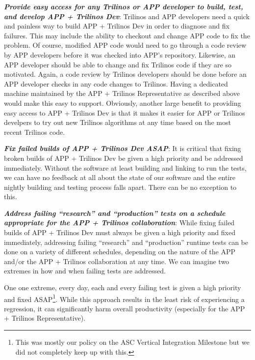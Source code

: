 \documentclass[pdf,ps2pdf,11pt]{SANDreport}
\begin{document}
{}\textit{\textbf{Provide easy access for any Trilinos or APP developer to
build, test, and develop APP + Trilinos Dev}}: Trilinos and APP developers
need a quick and painless way to build APP + Trilinos Dev in order to diagnose
and fix failures.  This may include the ability to checkout and change APP
code to fix the problem.  Of course, modified APP code would need to go
through a code review by APP developers before it was checked into APP's
repository.  Likewise, an APP developer should be able to change and fix
Trilinos code if they are so motivated.  Again, a code review by Trilinos
developers should be done before an APP developer checks in any code changes
to Trilinos.  Having a dedicated machine maintained by the APP + Trilinos
Representative as described above would make this easy to support.  Obviously,
another large benefit to providing easy access to APP + Trilinos Dev is that
it makes it easier for APP or Trilinos develpers to try out new Trilinos
algorithms at any time based on the most recent Trilinos code.

{}\textit{\textbf{Fix failed builds of APP + Trilinos Dev ASAP}}: It is
critical that fixing broken builds of APP + Trilinos Dev be given a high
priority and be addressed immediately.  Without the software at least building
and linking to run the tests, we can have no feedback at all about the state
of our software and the entire nightly building and testing process falls
apart.  There can be no exception to this.

{}\textit{\textbf{Address failing ``research'' and ``production'' tests on a
schedule appropriate for the APP + Trilinos collaboration}}: While fixing
failed builds of APP + Trilinos Dev must always be given a high priority and
fixed immediately, addressing failing ``research'' and ``production'' runtime
tests can be done on a variety of different schedules, depending on the nature
of the APP and/or the APP + Trilinos collaboration at any time.  We can
imagine two extremes in how and when failing tests are addressed.

One one extreme, every day, each and every failing test is given a high
priority and fixed ASAP\footnote{This was mostly our policy on the ASC
Vertical Integration Milestone but we did not completely keep up with this.}.
While this approach results in the least risk of experiencing a regression, it
can significantly harm overall productivity (especially for the APP + Trilinos
Representative).
\end{document}
